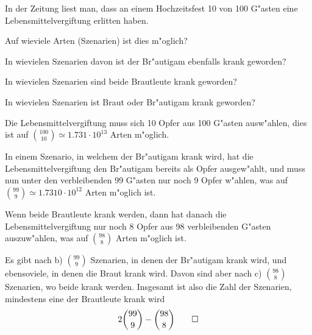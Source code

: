 In der Zeitung liest man, dass an einem Hochzeitsfest 10
von 100 G"asten eine Lebensmittelvergiftung erlitten haben.
\begin{teilaufgaben}
\item
Auf wieviele Arten (Szenarien) ist dies m"oglich?
\item
In wievielen Szenarien
davon ist der Br"autigam ebenfalls krank geworden?
\item In wievielen Szenarien sind beide Brautleute krank
geworden?
\item In wievielen Szenarien ist Braut oder Br"autigam
krank geworden?
\end{teilaufgaben}

\begin{loesung}
\begin{teilaufgaben}
\item Die Lebensmittelvergiftung muss sich 10 Opfer aus 100 G"asten
ausw"ahlen, dies ist auf $ \binom{100}{10}\simeq 1.731\cdot10^{13}$
Arten m"oglich.
\item
In einem Szenario, in welchem der Br"autigam krank wird, hat die
Lebensmittelvergiftung den Br"autigam bereits als Opfer ausgew"ahlt,
und muss nun unter den verbleibenden 99 G"asten nur noch 9 Opfer
w"ahlen, was auf $\binom{99}{9}\simeq1.7310\cdot10^{12}$ Arten
m"oglich ist.
\item
Wenn beide Brautleute krank werden, dann hat danach die Lebensmittelvergiftung
nur noch 8 Opfer aus 98 verbleibenden G"asten auszuw"ahlen, was auf
$\binom{98}{8}$ Arten m"oglich ist.
\item
Es gibt nach b) $\binom{99}{9}$ Szenarien, in denen der Br"autigam
krank wird, und ebensoviele, in denen die Braut krank wird. Davon
sind aber nach c) $\binom{98}{8}$ Szenarien, wo beide krank werden.
Insgesamt ist also die Zahl der Szenarien, mindestens eine der Brautleute
krank wird
\[
2\binom{99}{9}-\binom{98}{8}
\qedhere
\]
\end{teilaufgaben}
\end{loesung}

